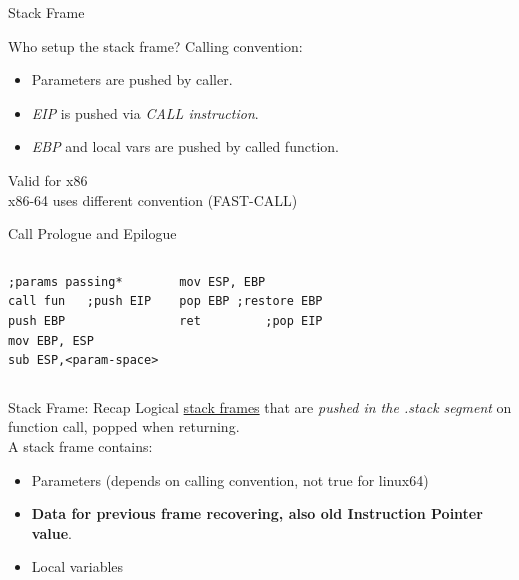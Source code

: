 \begin{frame}{Stack Frame}
\begin{block}{Who setup the stack frame?}
Calling convention:
\begin{itemize}
\item Parameters are pushed by caller.
\item \emph{EIP} is pushed via \emph{CALL instruction}.
\item \emph{EBP} and local vars are pushed by called function.
\end{itemize}
\hfill \tiny Valid for x86\\
\hfill x86-64 uses different convention (FAST-CALL)
\end{block}

\framebreak

\begin{block}{Call Prologue and Epilogue}
\begin{columns}[c] 
    \acode
    \tiny
\begin{lstlisting}
;params passing*
call fun   ;push EIP
push EBP
mov EBP, ESP
sub ESP,<param-space>
\end{lstlisting}
     \acode
     \tiny
\begin{lstlisting}
mov ESP, EBP
pop EBP ;restore EBP
ret         ;pop EIP
\end{lstlisting}
\end{columns}
\end{block}

\framebreak

\begin{block}{Stack Frame: Recap}
Logical \underline{stack frames} that are \emph{pushed in the .stack segment} on function call, popped when returning.\\
A stack frame contains:
\begin{itemize}
\item Parameters (depends on calling convention, not true for linux64)
\item {\bf Data for previous frame recovering, also old Instruction Pointer value}.
\item Local variables
\end{itemize}
\end{block}

\framebreak


\end{frame}
